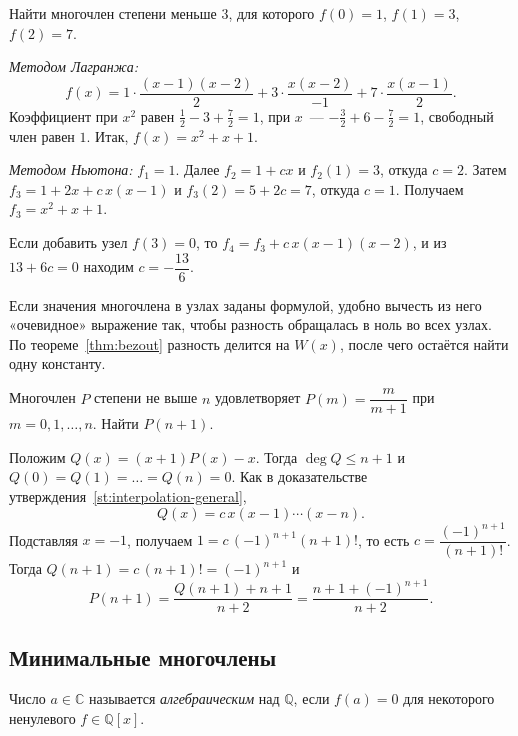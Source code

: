 \documentclass[12pt]{article}
\begin{document}
	\begin{example}\label{ex:interpolation-basic}
		Найти многочлен степени меньше $3$, для которого $f(0) = 1$, $f(1) = 3$, $f(2) = 7$.

		\emph{Методом Лагранжа:}
		\[
			f(x) = 1 \cdot \frac{(x - 1)(x - 2)}{2} + 3 \cdot \frac{x(x - 2)}{-1} + 7 \cdot \frac{x(x - 1)}{2}.
		\]
		Коэффициент при $x^2$ равен $\frac{1}{2} - 3 + \frac{7}{2} = 1$, при $x$~--- $-\frac{3}{2} + 6 - \frac{7}{2} = 1$, свободный член равен $1$. Итак, $f(x) = x^2 + x + 1$.

		\emph{Методом Ньютона:} $f_1 = 1$. Далее $f_2 = 1 + cx$ и $f_2(1) = 3$, откуда $c = 2$. Затем $f_3 = 1 + 2x + c\,x(x - 1)$ и $f_3(2) = 5 + 2c = 7$, откуда $c = 1$. Получаем $f_3 = x^2 + x + 1$.

		Если добавить узел $f(3) = 0$, то $f_4 = f_3 + c\,x(x - 1)(x - 2)$, и из $13 + 6c = 0$ находим $c = -\dfrac{13}{6}$.
	\end{example}

	\begin{method}\label{meth:aux-poly}
		Если значения многочлена в узлах заданы формулой, удобно вычесть из него «очевидное» выражение так, чтобы разность обращалась в ноль во всех узлах. По теореме~\ref{thm:bezout} разность делится на $W(x)$, после чего остаётся найти одну константу.
	\end{method}

	\begin{example}\label{ex:interpolation-aux}
		Многочлен $P$ степени не выше $n$ удовлетворяет $P(m) = \dfrac{m}{m + 1}$ при $m = 0, 1, \dots, n$. Найти $P(n + 1)$.

		Положим $Q(x) = (x + 1)P(x) - x$. Тогда $\deg Q \leqslant n + 1$ и $Q(0) = Q(1) = \dots = Q(n) = 0$. Как в доказательстве утверждения~\ref{st:interpolation-general},
		\[
			Q(x) = c\,x(x - 1) \cdots (x - n).
		\]
		Подставляя $x = -1$, получаем $1 = c\,(-1)^{n+1}(n + 1)!$, то есть $c = \dfrac{(-1)^{n+1}}{(n + 1)!}$. Тогда $Q(n + 1) = c\,(n + 1)! = (-1)^{n+1}$ и
		\[
			P(n + 1) = \frac{Q(n + 1) + n + 1}{n + 2} = \frac{n + 1 + (-1)^{n+1}}{n + 2}.
		\]
	\end{example}
    
	\subsection{Минимальные многочлены}

	\begin{definition}
		Число $a \in \mathbb{C}$ называется \emph{алгебраическим} над $\mathbb{Q}$, если $f(a) = 0$ для некоторого ненулевого $f \in \mathbb{Q}[x]$.
	\end{definition}
\end{document}
